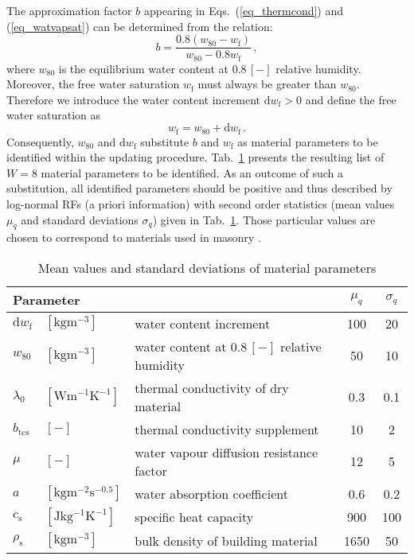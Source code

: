 \documentclass[preprint,12pt]{elsarticle}
\begin{document}
The approximation factor $b$ appearing in Eqs.~(\ref{eq_thermcond})
and (\ref{eq_watvapsat}) can be determined from the relation:
\begin{equation}
b = \frac{0.8(w_{80}-w_\mathrm{f})}{w_{80}-0.8w_\mathrm{f}} \, ,
\end{equation}
where $w_{80}$ is the equilibrium water content at $0.8\,\mathrm{[-]}$
relative humidity. Moreover, the free water saturation $w_\mathrm{f}$ must
always be greater than $w_{80}$. Therefore we introduce the water content
increment $\mathrm{d}w_\mathrm{f} > 0$ and define the free water saturation
as
\begin{equation}
w_\mathrm{f} = w_{80} + \mathrm{d}w_\mathrm{f} \, .
\end{equation}
Consequently, $w_{80}$ and $\mathrm{d}w_\mathrm{f}$ substitute $b$
and $w_\mathrm{f}$ as material parameters to be identified within
the updating procedure.  Tab.~\ref{tab_params} presents the
resulting list of $W=8$ material parameters to be identified. As
an outcome of such a substitution, all identified parameters
should be positive and thus described by log-normal RFs (a priori
information) with second order statistics (mean values $\mu_q$ and
standard deviations $\sigma_q$) given in Tab.~\ref{tab_params}.
Those particular values are chosen to correspond to materials used
in masonry \cite{Pavlik:SFR:2010}.
\begin{table}[h!]
\centering
\begin{tabular}{lllcc}
\multicolumn{3}{l}{Parameter} & $\mu_q$ & $\sigma_q$ \\
\hline
$\mathrm{d}w_\mathrm{f}$ & $\mathrm{[kgm^{-3}]}$ &  water content
increment & 100 & 20 \\
$w_{\mathrm{80}}$ & $\mathrm{[kgm^{-3}]}$ &  water content at $0.8\,\mathrm{[-]}$ relative humidity & 50 & 10 \\
$\lambda_{\mathrm{0}}$ & $\mathrm{[Wm^{-1}K^{-1}]}$ &  thermal conductivity of dry material & 0.3 & 0.1 \\
$b_{\mathrm{tcs}}$ & $\mathrm{[-]}$ &  thermal conductivity supplement & 10 & 2  \\
$\mu$ & $\mathrm{[-]}$ &  water vapour diffusion resistance factor & 12 & 5 \\
$a$ & $\mathrm{[kgm^{-2}s^{-0.5}]}$ &  water absorption
coefficient & 0.6 & 0.2 \\
$c_\mathrm{s}$ & $\mathrm{[Jkg^{-1}K^{-1}]}$ &  specific heat capacity & 900 & 100 \\
$\rho_\mathrm{s}$ & $\mathrm{[kgm^{-3}]}$ &  bulk density of building material & 1650 & 50 \\
\hline
\end{tabular}
\caption{Mean values and standard deviations of
  material parameters} \label{tab_params}
\end{table}
\end{document}

